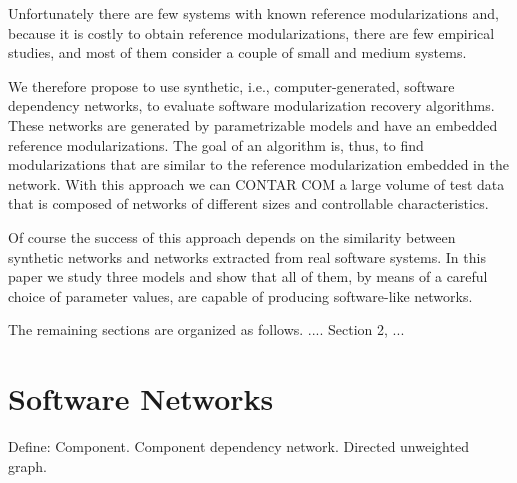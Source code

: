 Unfortunately there are few systems with known reference modularizations and,
because it is costly to obtain reference modularizations, there are few
empirical studies, and most of them consider a couple of small and medium
systems.

We therefore propose to use synthetic, i.e., computer-generated, software
dependency networks, to evaluate software modularization recovery algorithms.
These networks are generated by parametrizable models and have an embedded
reference modularizations. The goal of an algorithm is, thus, to find
modularizations that are similar to the reference modularization embedded in the
network. With this approach we can CONTAR COM a large volume of test data that
is composed of networks of different sizes and controllable characteristics.

Of course the success of this approach depends on the similarity between
synthetic networks and networks extracted from real software systems. In this
paper we study three models and show that all of them, by means of a careful
choice of parameter values, are capable of producing software-like networks.

The remaining sections are organized as follows. .... Section 2, ...


%

%

\section{Software Networks}

Define: Component. Component dependency network. Directed unweighted graph.

